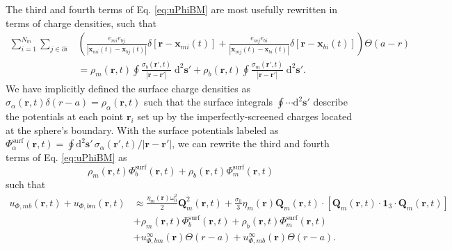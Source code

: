 \documentclass{article}
\begin{document}
The third and fourth terms of Eq. \eqref{eq:uPhiBM} are most usefully rewritten in terms of charge densities, such that
\begin{equation}
\begin{split}
\sum_{i = 1}^{N_m}\sum_{j\in\partial i}&\left(\frac{e_{mi}e_{bj}}{|\mathbf{x}_{mi}(t) - \mathbf{x}_{bj}(t)|}\delta[\mathbf{r} - \mathbf{x}_{mi}(t)] + \frac{e_{mj}e_{bi}}{|\mathbf{x}_{mj}(t) - \mathbf{x}_{bi}(t)|}\delta[\mathbf{r} - \mathbf{x}_{bi}(t)]\right)\Theta(a - r)\\
&= \rho_m(\mathbf{r},t)\oint\frac{\sigma_b(\mathbf{r}',t)}{|\mathbf{r} - \mathbf{r}'|}\;\mathrm{d}^2\mathbf{s}' + \rho_b(\mathbf{r},t)\oint\frac{\sigma_m(\mathbf{r}',t)}{|\mathbf{r} - \mathbf{r}'|}\;\mathrm{d}^2\mathbf{s}'.
\end{split}
\end{equation}
We have implicitly defined the surface charge densities as $\sigma_\alpha(\mathbf{r},t)\delta(r - a) = \rho_\alpha(\mathbf{r},t)$ such that the surface integrals $\oint\cdots\mathrm{d}^2\mathbf{s}'$ describe the potentials at each point $\mathbf{r}_i$ set up by the imperfectly-screened charges located at the sphere's boundary. With the surface potentials labeled as $\Phi_\alpha^\mathrm{surf}(\mathbf{r},t) = \oint\mathrm{d}^2\mathbf{s}'\,\sigma_\alpha(\mathbf{r}',t)/|\mathbf{r} - \mathbf{r}'|$, we can rewrite the third and fourth terms of Eq. \eqref{eq:uPhiBM} as
\begin{equation}
\rho_m(\mathbf{r},t)\Phi_b^\mathrm{surf}(\mathbf{r},t) + \rho_b(\mathbf{r},t)\Phi_m^\mathrm{surf}(\mathbf{r},t)
\end{equation}
such that
\begin{equation}
\begin{split}
u_{\Phi,mb}(\mathbf{r},t) + u_{\Phi,bm}(\mathbf{r},t) &\approx \frac{\eta_m(\mathbf{r})\omega_0^2}{2}\mathbf{Q}_m^2(\mathbf{r},t) + \frac{\sigma_0}{3}\eta_m(\mathbf{r})\mathbf{Q}_m(\mathbf{r},t)\cdot\left[\mathbf{Q}_m(\mathbf{r},t)\cdot\bm{1}_3\cdot\mathbf{Q}_m(\mathbf{r},t)\right]\\
&+ \rho_m(\mathbf{r},t)\Phi_b^\mathrm{surf}(\mathbf{r},t) + \rho_b(\mathbf{r},t)\Phi_m^\mathrm{surf}(\mathbf{r},t)\\
&+ u_{\Phi,bm}^\infty(\mathbf{r})\Theta(r - a) + u_{\Phi,mb}^\infty(\mathbf{r})\Theta(r - a).
\end{split}
\end{equation}
\end{document}
